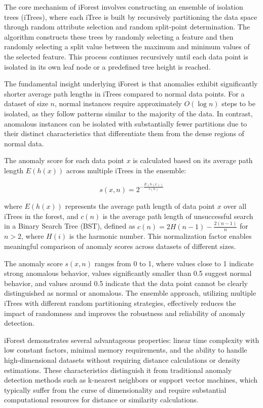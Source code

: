 \documentclass[a4paper]{cas-dc}
\begin{document}
The core mechanism of iForest involves constructing an ensemble of isolation trees (iTrees), where each iTree is built by recursively partitioning the data space through random attribute selection and random split-point determination. The algorithm constructs these trees by randomly selecting a feature and then randomly selecting a split value between the maximum and minimum values of the selected feature. This process continues recursively until each data point is isolated in its own leaf node or a predefined tree height is reached.

The fundamental insight underlying iForest is that anomalies exhibit significantly shorter average path lengths in iTrees compared to normal data points. For a dataset of size $n$, normal instances require approximately $O(\log n)$ steps to be isolated, as they follow patterns similar to the majority of the data. In contrast, anomalous instances can be isolated with substantially fewer partitions due to their distinct characteristics that differentiate them from the dense regions of normal data.

The anomaly score for each data point $x$ is calculated based on its average path length $E(h(x))$ across multiple iTrees in the ensemble:

\begin{equation}
	s(x, n) = 2^{-\frac{E(h(x))}{c(n)}}
\end{equation}

where $E(h(x))$ represents the average path length of data point $x$ over all iTrees in the forest, and $c(n)$ is the average path length of unsuccessful search in a Binary Search Tree (BST), defined as $c(n) = 2H(n-1) - \frac{2(n-1)}{n}$ for $n > 2$, where $H(i)$ is the harmonic number. This normalization factor enables meaningful comparison of anomaly scores across datasets of different sizes.

The anomaly score $s(x, n)$ ranges from 0 to 1, where values close to 1 indicate strong anomalous behavior, values significantly smaller than 0.5 suggest normal behavior, and values around 0.5 indicate that the data point cannot be clearly distinguished as normal or anomalous. The ensemble approach, utilizing multiple iTrees with different random partitioning strategies, effectively reduces the impact of randomness and improves the robustness and reliability of anomaly detection.

iForest demonstrates several advantageous properties: linear time complexity with low constant factors, minimal memory requirements, and the ability to handle high-dimensional datasets without requiring distance calculations or density estimations. These characteristics distinguish it from traditional anomaly detection methods such as k-nearest neighbors or support vector machines, which typically suffer from the curse of dimensionality and require substantial computational resources for distance or similarity calculations.
\end{document}
